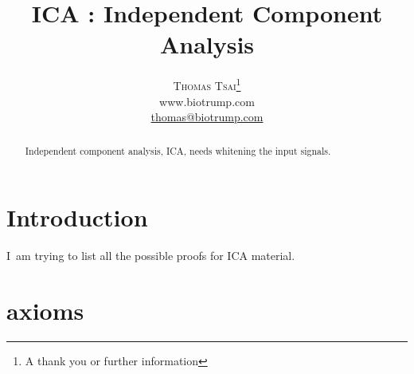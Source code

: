 \documentclass[a4paper,12pt]{article}
\title{\vspace{-15mm}\fontsize{24pt}{10pt}\selectfont\textbf{ICA : Independent Component Analysis}} %
\author{
\large
\textsc{Thomas Tsai}\thanks{A thank you or further information}\\[2mm] %
\normalsize www.biotrump.com \\ %
\normalsize \href{mailto:thomas@biotrump.com}{thomas@biotrump.com} %
\vspace{-5mm}
}
\date{}
\begin{document}
\maketitle %

\thispagestyle{fancy} %


\begin{abstract}

Independent component analysis, ICA, needs whitening the input signals.

\end{abstract}


\begin{multicols}{2} %
\end{multicols}

\section{Introduction}

\lettrine[nindent=0em,lines=3]{I}\ am trying to list all the possible proofs for ICA material.


\section{axioms}
\end{document}
